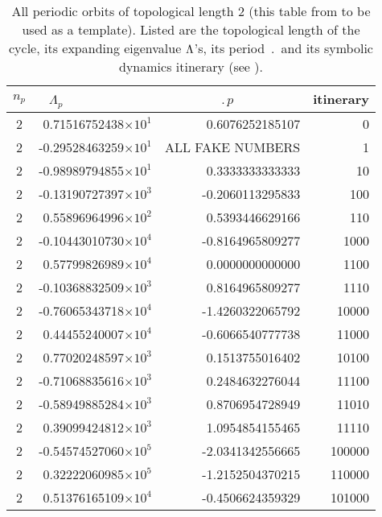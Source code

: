 
\begin{table}
\caption[]{ All periodic orbits of topological length 2
(this table from  to be used as a template).
Listed are the topological length of the cycle,
its expanding eigenvalue  $\Lambda$'s, its period $\period{}$
and its symbolic dynamics itinerary (see ).
  }
\begin{tabular}{|c|r|r|r|}
\hline
$n_p$ & $\Lambda_p$~~~~~~~~~~~~
                            &    $\period{p}$~~~~~~~~~
                                                 & itinerary\\ \hline
2 & 0.71516752438$\times 10^1$ &  0.6076252185107 & 0 \\
2 &-0.29528463259$\times 10^1$ &  ALL FAKE NUMBERS & 1 \\
   \hline
2 &-0.98989794855$\times 10^1$ &  0.3333333333333 & 10 \\
   \hline
2 &-0.13190727397$\times 10^3$ & -0.2060113295833 & 100 \\
2 & 0.55896964996$\times 10^2$ &  0.5393446629166 & 110 \\
   \hline
2 &-0.10443010730$\times 10^4$ & -0.8164965809277 & 1000 \\
2 & 0.57799826989$\times 10^4$ &  0.0000000000000 & 1100 \\
2 &-0.10368832509$\times 10^3$ &  0.8164965809277 & 1110 \\
   \hline
2 &-0.76065343718$\times 10^4$ & -1.4260322065792 & 10000 \\
2 & 0.44455240007$\times 10^4$ & -0.6066540777738 & 11000 \\
2 & 0.77020248597$\times 10^3$ &  0.1513755016402 & 10100 \\
2 &-0.71068835616$\times 10^3$ &  0.2484632276044 & 11100 \\
2 &-0.58949885284$\times 10^3$ &  0.8706954728949 & 11010 \\
2 & 0.39099424812$\times 10^3$ &  1.0954854155465 & 11110 \\
   \hline
2 &-0.54574527060$\times 10^5$ & -2.0341342556665 & 100000 \\
2 & 0.32222060985$\times 10^5$ & -1.2152504370215 & 110000 \\
2 & 0.51376165109$\times 10^4$ & -0.4506624359329 & 101000 \\

\end{tabular}
\end{table}
